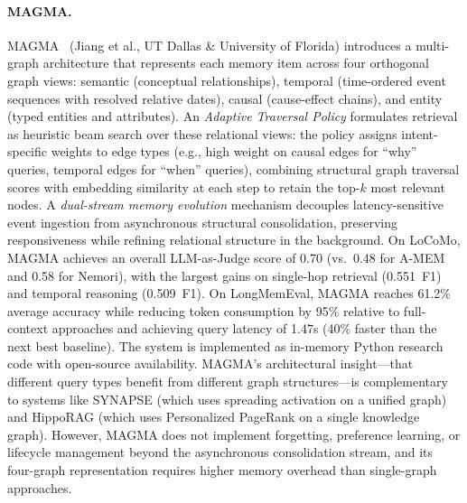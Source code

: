 \paragraph{MAGMA.}
MAGMA~\cite{magma2026} (Jiang et al., UT Dallas \& University of
Florida) introduces a multi-graph architecture that represents each
memory item across four orthogonal graph views: semantic (conceptual
relationships), temporal (time-ordered event sequences with resolved
relative dates), causal (cause-effect chains), and entity (typed entities
and attributes).  An \emph{Adaptive Traversal Policy} formulates
retrieval as heuristic beam search over these relational views: the
policy assigns intent-specific weights to edge types (e.g., high weight
on causal edges for ``why'' queries, temporal edges for ``when''
queries), combining structural graph traversal scores with embedding
similarity at each step to retain the top-$k$ most relevant nodes.  A
\emph{dual-stream memory evolution} mechanism decouples latency-sensitive
event ingestion from asynchronous structural consolidation, preserving
responsiveness while refining relational structure in the background.
On LoCoMo, MAGMA achieves an overall LLM-as-Judge score of 0.70
(vs.\ 0.48 for A-MEM and 0.58 for Nemori), with the largest gains on
single-hop retrieval (0.551~F1) and temporal reasoning (0.509~F1).  On
LongMemEval, MAGMA reaches 61.2\% average accuracy while reducing token
consumption by 95\% relative to full-context approaches and achieving
query latency of 1.47s (40\% faster than the next best baseline).  The
system is implemented as in-memory Python research code with open-source
availability.  MAGMA's architectural insight---that different query types
benefit from different graph structures---is complementary to systems
like SYNAPSE (which uses spreading activation on a unified graph) and
HippoRAG (which uses Personalized PageRank on a single knowledge graph).
However, MAGMA does not implement forgetting, preference learning, or
lifecycle management beyond the asynchronous consolidation stream, and
its four-graph representation requires higher memory overhead than
single-graph approaches.

